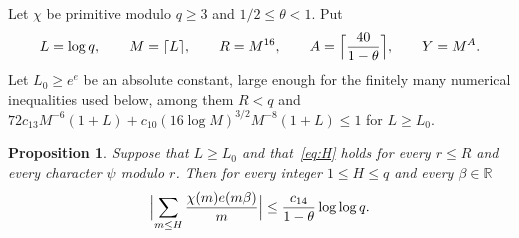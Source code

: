 \documentclass[11pt,a4paper,reqno]{amsart}
\newtheorem{proposition}[theorem]{Proposition}
\theoremstyle{remark}
\numberwithin{equation}{section}
\newcommand{\R}{\mathbb{R}}
\begin{document}
Let $\chi$ be primitive modulo $q\ge3$ and $1/2\le\theta<1$. Put
\[
  L=\log q,\qquad M=\lceil L\rceil,\qquad R=M^{16},\qquad A=\Bigl\lceil\frac{40}{1-\theta}\Bigr\rceil,\qquad Y=M^A .
\]
Let $L_0\ge e^{e}$ be an absolute constant, large enough for the finitely many numerical inequalities used below, among them $R<q$ and $72c_{13}M^{-6}(1+L)+c_{10}(16\log M)^{3/2}M^{-8}(1+L)\le1$ for $L\ge L_0$.

\begin{proposition}\label{prop:harm}
Suppose that $L\ge L_0$ and that~\eqref{eq:H} holds for every $r\le R$ and every character $\psi$ modulo $r$. Then for every integer $1\le H\le q$ and every $\beta\in\R$
\[
  \Bigl|\sum_{m\le H}\frac{\chi(m)e(m\beta)}m\Bigr|\le\frac{c_{14}}{1-\theta}\log\log q .
\]
\end{proposition}
\end{document}
